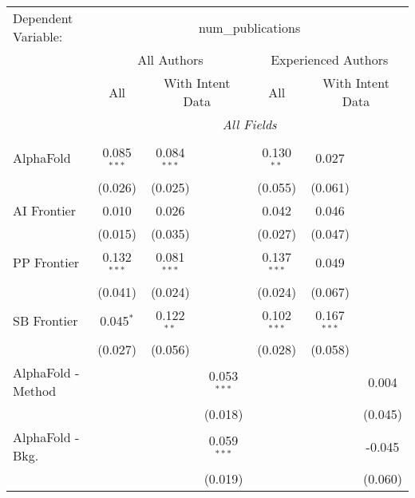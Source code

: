 \begingroup
\centering
\begin{tabular}{lcccccc}
   \tabularnewline \midrule \midrule
   Dependent Variable: & \multicolumn{6}{c}{num\_publications}\\
 & \multicolumn{3}{c}{All Authors} & \multicolumn{3}{c}{Experienced Authors} \\
\cmidrule(lr){2-4} \cmidrule(lr){5-7}
 & \multicolumn{1}{c}{All} & \multicolumn{2}{c}{With Intent Data} & \multicolumn{1}{c}{All} & \multicolumn{2}{c}{With Intent Data} \\
\cmidrule(lr){2-2} \cmidrule(lr){3-4} \cmidrule(lr){5-5} \cmidrule(lr){6-7}
 & \multicolumn{6}{c}{\textit{All Fields}} \\ \\
   AlphaFold            & 0.085$^{***}$ & 0.084$^{***}$ &               & 0.130$^{**}$  & 0.027         &   \\   
                        & (0.026)       & (0.025)       &               & (0.055)       & (0.061)       &   \\   
   AI Frontier          & 0.010         & 0.026         &               & 0.042         & 0.046         &   \\   
                        & (0.015)       & (0.035)       &               & (0.027)       & (0.047)       &   \\   
   PP Frontier          & 0.132$^{***}$ & 0.081$^{***}$ &               & 0.137$^{***}$ & 0.049         &   \\   
                        & (0.041)       & (0.024)       &               & (0.024)       & (0.067)       &   \\   
   SB Frontier          & 0.045$^{*}$   & 0.122$^{**}$  &               & 0.102$^{***}$ & 0.167$^{***}$ &   \\   
                        & (0.027)       & (0.056)       &               & (0.028)       & (0.058)       &   \\   
   AlphaFold - Method   &               &               & 0.053$^{***}$ &               &               & 0.004\\   
                        &               &               & (0.018)       &               &               & (0.045)\\   
   AlphaFold - Bkg.     &               &               & 0.059$^{***}$ &               &               & -0.045\\   
                        &               &               & (0.019)       &               &               & (0.060)\\   

\end{tabular}
